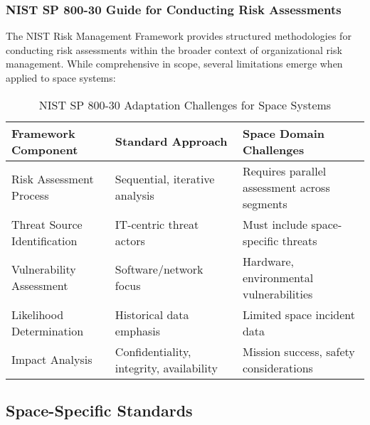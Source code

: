 \documentclass[binding=0.6cm]{sapthesis}
\begin{document}
\subsubsection{NIST SP 800-30 Guide for Conducting Risk Assessments}

The NIST Risk Management Framework provides structured methodologies for conducting risk assessments within the broader context of organizational risk management. While comprehensive in scope, several limitations emerge when applied to space systems:

\begin{table}[H]
\centering
\caption{NIST SP 800-30 Adaptation Challenges for Space Systems}
\begin{tabular}{|l|l|l|}
\hline
\textbf{Framework Component} & \textbf{Standard Approach} & \textbf{Space Domain Challenges} \\ \hline
Risk Assessment Process & Sequential, iterative analysis & Requires parallel assessment across segments \\ \hline
Threat Source Identification & IT-centric threat actors & Must include space-specific threats \\ \hline
Vulnerability Assessment & Software/network focus & Hardware, environmental vulnerabilities \\ \hline
Likelihood Determination & Historical data emphasis & Limited space incident data \\ \hline
Impact Analysis & Confidentiality, integrity, availability & Mission success, safety considerations \\ \hline
\end{tabular}
\end{table}

\subsection{Space-Specific Standards}
\end{document}
